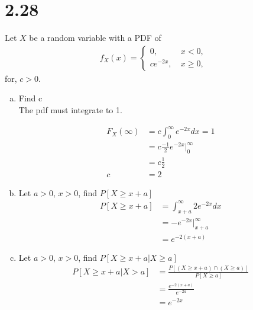 \documentclass[12pt]{article}
\newcommand{\mysection}[1]{\section*{#1}}
\begin{document}
\mysection{2.28}
Let $X$ be a random variable with a PDF of 
\begin{align*}
  f_X(x) =
  \begin{cases}
    0,          &\ x< 0,\\
    ce^{-2x},   &\ x\geq 0,
  \end{cases}
\end{align*}
  for, $c>0$.
\begin{enumerate}[(a)]
  \item Find c  \\
    The pdf must integrate to 1.

    \begin{align*}
      F_X(\infty)&=c\int_0^\infty e^{-2x}dx = 1\\
                 &=c\frac{-1}{2}e^{-2x}\big|_0^\infty\\
                 &=c\frac{1}{2}\\
                c&=2
    \end{align*}
  
  \item Let $a>0$, $x>0$, find $P[X\geq x+a]$
    \begin{align*}
      P[X\geq x+a]&=\int_{x+a}^\infty2e^{-2x}dx\\
                  &=-e^{-2x}\big|_{x+a}^\infty\\
                  &=e^{-2(x+a)}
    \end{align*}

  \item Let $a>0$, $x>0$, find $P[X\geq x+a|X\geq a]$
    \begin{align*}
      P[X\geq x+a|X>a]&=\frac{P[(X\geq x+a)\cap(X\geq a)]}{P[X\geq a]}\\
                      &=\frac{e^{-2(x+a)}}{e^{-2a}}\\
                      &=e^{-2x}
    \end{align*}
\end{enumerate}
\newpage 
\end{document}
